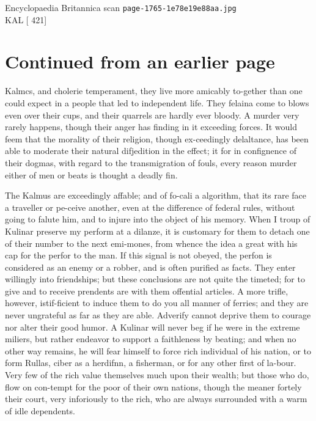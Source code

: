 \documentclass{article}
\begin{document}
\begin{center}
{\Large Encyclopaedia Britannica scan \texttt{page-1765-1e78e19e88aa.jpg}}\\[0.5em]
KAL [ 421]
\end{center}
\section*{Continued from an earlier page}
Kalmcs, and cholerie temperament, they live more amicably to-gether than one could expect in a people that led to independent life. They felaina come to blows even over their cups, and their quarrels are hardly ever bloody. A murder very rarely happens, though their anger has finding in it exceeding forces. It would feem that the morality of their religion, though ex-ceedingly delaltance, has been able to moderate their natural difjedition in the effect; it for in confignence of their dogmas, with regard to the transmigration of fouls, every reason murder either of men or beats is thought a deadly fin.

The Kalmus are exceedingly affable; and of fo-cali a algorithm, that its rare face a traveller or pe-ceive another, even at the difference of federal rules, without going to falute him, and to injure into the object of his memory. When I troup of Kulinar preserve my perform at a dilanze, it is customary for them to detach one of their number to the next emi-mones, from whence the idea a great with his cap for the perfor to the man. If this signal is not obeyed, the perfon is considered as an enemy or a robber, and is often purified as facts. They enter willingly into friendships; but these conclusions are not quite the timeted; for to give and to receive prendents are with them offential articles. A more trifle, however, istif-ficient to induce them to do you all manner of ferries; and they are never ungrateful as far as they are able. Adverify cannot deprive them to courage nor alter their good humor. A Kulinar will never beg if he were in the extreme miliers, but rather endeavor to support a faithleness by beating; and when no other way remains, he will fear himself to force rich individual of his nation, or to form Rullas, ciber as a herdifnn, a fisherman, or for any other first of la-bour. Very few of the rich value themselves much upon their wealth; but those who do, flow on con-tempt for the poor of their own nations, though the meaner fortely their court, very inforiously to the rich, who are always surrounded with a warm of idle dependents.
\end{document}
